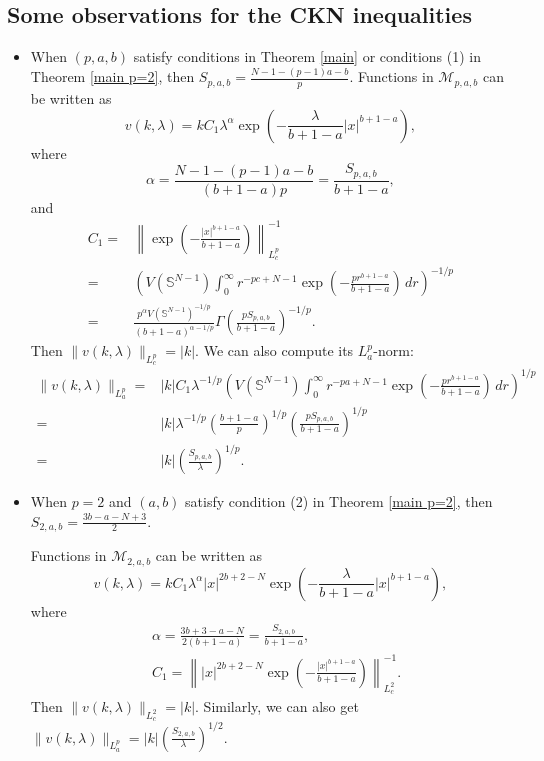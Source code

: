 \documentclass[11pt]{article}
\numberwithin{equation}{section}
\begin{document}
\subsection{Some  observations for the CKN inequalities}
\begin{itemize}
    \item When $(p,a,b)$ satisfy conditions in Theorem \ref{main} or conditions (1) in Theorem \ref{main p=2}, then $S_{p,a,b}= \frac{N-1-(p-1)a-b}{p}$. Functions in $\mathcal{M}_{p,a,b}$ can be written as
    \[v(k,\lambda) = kC_1\lambda^{\alpha}\exp\left(-\frac{\lambda}{b+1-a}|x|^{b+1-a}\right),\]
    where
    \[ \alpha = \frac{N-1-(p-1)a-b}{(b+1-a)p} = \frac{S_{p,a,b}}{b+1-a},\]
    and
    \begin{align*}
        C_1 ={}& \left\|\exp\left(-\frac{|x|^{b+1-a}}{b+1-a}\right)\right\|_{L^p_c}^{-1} \\
        ={}& \left( V(\mathbb{S}^{N-1}) \int_0^\infty r^{-pc+N-1} \exp\left(-\frac{pr^{b+1-a}}{b+1-a}\right)\,dr \right)^{-1/p} \\
        ={}& \frac{p^\alpha V(\mathbb{S}^{N-1})^{-1/p}}{(b+1-a)^{\alpha-1/p}}\Gamma\left(\frac{pS_{p,a,b}}{b+1-a}\right)^{-1/p}.
    \end{align*}
    Then $\|v(k,\lambda)\|_{L^p_c} = |k|$. We can also compute its $L^p_a$-norm:
    \begin{align*}
        \|v(k,\lambda)\|_{L^p_a} ={}& |k|C_1\lambda^{-1/p}\left(V(\mathbb{S}^{N-1})\int_0^\infty r^{-pa+N-1}\exp\left(-\frac{pr^{b+1-a}}{b+1-a}\right)\,dr\right)^{1/p} \\
        ={}& |k|\lambda^{-1/p} \left(\frac{b+1-a}{p}\right)^{1/p}\left(\frac{pS_{p,a,b}}{b+1-a}\right)^{1/p}\\
        ={}& |k|\left(\frac{S_{p,a,b}}{\lambda}\right)^{1/p}.
    \end{align*}

    \item When $p=2$ and $(a,b)$ satisfy condition (2) in Theorem \ref{main p=2}, then $S_{2,a,b} = \frac{3b-a-N+3}{2}$.

    Functions in $\mathcal{M}_{2,a,b}$ can be written as
    \[ v(k,\lambda) = k C_1\lambda^\alpha |x|^{2b+2-N}\exp\left(-\frac{\lambda}{b+1-a}|x|^{b+1-a}\right),\]
    where
    \begin{align*}
        & \alpha = \frac{3b+3-a-N}{2(b+1-a)} = \frac{S_{2,a,b}}{b+1-a}, \\
        & C_1 = \left\| |x|^{2b+2-N} \exp\left(-\frac{|x|^{b+1-a}}{b+1-a}\right)\right\|_{L^2_c}^{-1}.
    \end{align*}
    Then $\|v(k,\lambda)\|_{L^2_c} = |k|$. Similarly, we can also get $\|v(k,\lambda)\|_{L^p_a} = |k|\left(\frac{S_{2,a,b}}{\lambda}\right)^{1/2}$.
\end{itemize}
\end{document}
